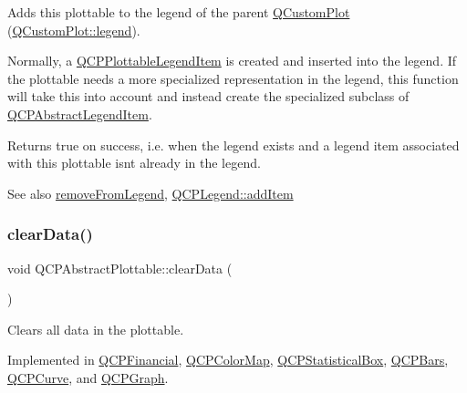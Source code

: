 Adds this plottable to the legend of the parent \hyperlink{class_q_custom_plot}{Q\+Custom\+Plot} (\hyperlink{class_q_custom_plot_a4eadcd237dc6a09938b68b16877fa6af}{Q\+Custom\+Plot\+::legend}).

Normally, a \hyperlink{class_q_c_p_plottable_legend_item}{Q\+C\+P\+Plottable\+Legend\+Item} is created and inserted into the legend. If the plottable needs a more specialized representation in the legend, this function will take this into account and instead create the specialized subclass of \hyperlink{class_q_c_p_abstract_legend_item}{Q\+C\+P\+Abstract\+Legend\+Item}.

Returns true on success, i.\+e. when the legend exists and a legend item associated with this plottable isn\textquotesingle{}t already in the legend.

\begin{DoxySeeAlso}{See also}
\hyperlink{class_q_c_p_abstract_plottable_ac95fb2604d9106d0852ad9ceb326fe8c}{remove\+From\+Legend}, \hyperlink{class_q_c_p_legend_a3ab274de52d2951faea45a6d975e6b3f}{Q\+C\+P\+Legend\+::add\+Item} 
\end{DoxySeeAlso}
\hypertarget{class_q_c_p_abstract_plottable_a86e5b8fd4b6ff4f4084e7ea4c573fc53}{}\label{class_q_c_p_abstract_plottable_a86e5b8fd4b6ff4f4084e7ea4c573fc53} 
\subsubsection{\texorpdfstring{clear\+Data()}{clearData()}}
{\footnotesize\ttfamily void Q\+C\+P\+Abstract\+Plottable\+::clear\+Data (\begin{DoxyParamCaption}{ }\end{DoxyParamCaption})\hspace{0.3cm}{\ttfamily [pure virtual]}}

Clears all data in the plottable. 

Implemented in \hyperlink{class_q_c_p_financial_a11fd49928c33e55e27b7319c6927864a}{Q\+C\+P\+Financial}, \hyperlink{class_q_c_p_color_map_a0545dce5383766885912331705a8e099}{Q\+C\+P\+Color\+Map}, \hyperlink{class_q_c_p_statistical_box_a19112994449df0c20287858436cc68e3}{Q\+C\+P\+Statistical\+Box}, \hyperlink{class_q_c_p_bars_a11dbbd707132f07f862dff13c5789c2b}{Q\+C\+P\+Bars}, \hyperlink{class_q_c_p_curve_ae0462c61dbfbac07db0736ec64110241}{Q\+C\+P\+Curve}, and \hyperlink{class_q_c_p_graph_ad4e94a4e44e5e76fbec81a72a977157d}{Q\+C\+P\+Graph}.

